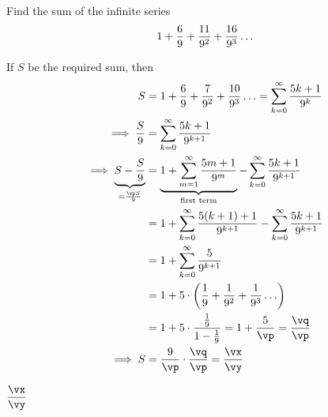 




\SUBTRACT{}\vp 
\ADD\vp\vb\vq 
\MULTIPLY\va\vq\vr
\SQUARE\vp\vs
\FRACTIONSIMPLIFY\vr\vs\vx\vy

\question[4] Find the sum of the infinite series 
\[ 1 + \frac{6}{9} + \frac{11}{9^2} + \frac{16}{9^3}\ldots \]

\watchout

\begin{solution}[\halfpage]
	If $S$ be the required sum, then
	\begin{align}
		S &= 1 + \frac{\vc}{\va} + \frac{7}{\va^2} + \frac{10}{\va^3}\ldots = 
      \sum_{k=0}^{\infty}\dfrac{\vb k+1}{\va^k} \\
		\implies\dfrac{S}{\va} &= \sum_{k=0}^{\infty}\dfrac{\vb k+1}{\va^{k+1}} \\
		\implies \underbrace{S - \dfrac{S}{\va}}_{= \frac{\vp S}{\va}} &= \underbrace{1 + \sum_{m=1}^{\infty}\dfrac{\vb m+1}{\va^m}}
		_{\text{first term}}- \sum_{k=0}^{\infty}\dfrac{\vb k+1}{\va^{k+1}} \\
		&= 1 + \sum_{k=0}^{\infty}\dfrac{\vb (k+1)+1}{\va^{k+1}}-\sum_{k=0}^{\infty}\dfrac{\vb k+1}{\va^{k+1}} \\
		&= 1 + \sum_{k=0}^{\infty}\dfrac{\vb }{\va^{k+1}} \\
		&= 1 + \vb\cdot\left( \dfrac{1}{\va} + \dfrac{1}{\va^2} + \dfrac{1}{\va^3}\ldots \right) \\
		&= 1 + \vb\cdot\dfrac{\frac{1}{\va}}{1-\frac{1}{\va}} = 1 + \dfrac{\vb}{\vp } = \dfrac{\vq}{\vp } \\
		\implies S &= \dfrac{\va}{\vp }\cdot\dfrac{\vq}{\vp } = \dfrac\vx\vy
	\end{align}
\end{solution}

\ifprintanswers\begin{codex}$\dfrac\vx\vy$\end{codex}\fi

